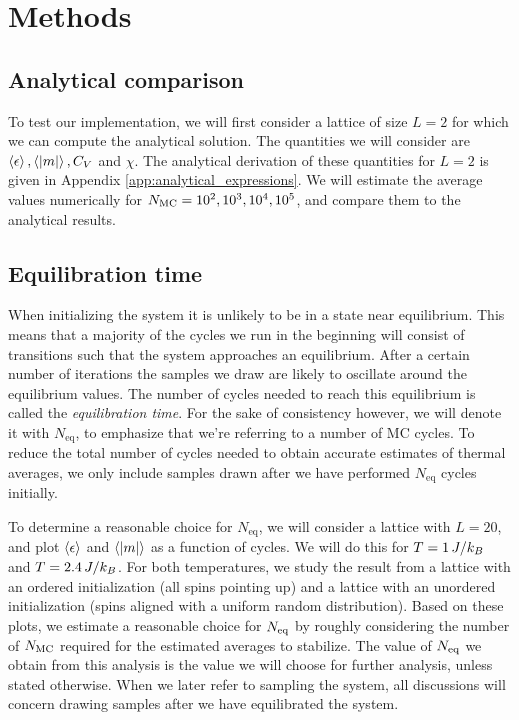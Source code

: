 \section{Methods}\label{sec:methods}

\subsection{Analytical comparison}\label{subsec_methods:analytical_test}
To test our implementation, we will first consider a lattice of size $L=2$ for which we can compute the analytical solution. The quantities we will consider are $\expval{\epsilon},\expval{\abs{m}},C_V$ and $\chi$. The analytical derivation of these quantities for $L=2$ is given in Appendix \ref{app:analytical_expressions}. We will estimate the average values numerically for $N_\mathrm{MC}=10^2,10^3,10^4,10^5$, and compare them to the analytical results.

\subsection{Equilibration time}\label{subsec_methods:equilibration_time}
When initializing the system it is unlikely to be in a state near equilibrium. This means that a majority of the cycles we run in the beginning will consist of transitions such that the system approaches an equilibrium. After a certain number of iterations the samples we draw are likely to oscillate around the equilibrium values. The number of cycles needed to reach this equilibrium is called the \textit{equilibration time}. For the sake of consistency however, we will denote it with $N_\mathrm{eq}$, to emphasize that we're referring to a number of MC cycles. To reduce the total number of cycles needed to obtain accurate estimates of thermal averages, we only include samples drawn after we have performed $N_\mathrm{eq}$ cycles initially. 

To determine a reasonable choice for $N_\mathrm{eq}$, we will consider a lattice with $L=20$, and plot $\expval{\epsilon}$ and $\expval{\abs{m}}$ as a function of cycles. We will do this for $T=1\,J/k_B$ and $T=2.4\,J/k_B$. For both temperatures, we study the result from a lattice with an ordered initialization (all spins pointing up) and a lattice with an unordered initialization (spins aligned with a uniform random distribution). Based on these plots, we estimate a reasonable choice for $N_\mathrm{eq}$ by roughly considering the number of $N_\mathrm{MC}$ required for the estimated averages to stabilize. The value of $N_\mathrm{eq}$ we obtain from this analysis is the value we will choose for further analysis, unless stated otherwise. When we later refer to sampling the system, all discussions will concern drawing samples after we have equilibrated the system.   


